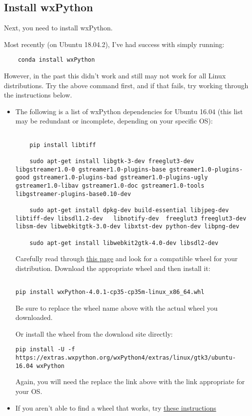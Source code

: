 \documentclass[11pt]{article}
\begin{document}
\subsection{Install wxPython}

Next, you need to install wxPython.

Most recently (on Ubuntu 18.04.2), I've had success with simply running:

\begin{verbatim}
    conda install wxPython
\end{verbatim}

However, in the past this didn't work and still may not work for all Linux distributions.  Try the above command first, and if that fails, try working through the instructions below.

\begin{itemize}
  \item The following is a list of wxPython dependencies for Ubuntu 16.04 (this list may be redundant or incomplete, depending on your specific OS):

  \begin{verbatim}

    pip install libtiff

    sudo apt-get install libgtk-3-dev freeglut3-dev libgstreamer1.0-0 gstreamer1.0-plugins-base gstreamer1.0-plugins-good gstreamer1.0-plugins-bad gstreamer1.0-plugins-ugly gstreamer1.0-libav gstreamer1.0-doc gstreamer1.0-tools libgstreamer-plugins-base0.10-dev

    sudo apt-get install dpkg-dev build-essential libjpeg-dev  libtiff-dev libsdl1.2-dev   libnotify-dev  freeglut3 freeglut3-dev libsm-dev libwebkitgtk-3.0-dev libxtst-dev python-dev libpng-dev

    sudo apt-get install libwebkit2gtk-4.0-dev libsdl2-dev
\end{verbatim}


Carefully read through \href{https://wxpython.org/pages/downloads/}{this page} and look for a compatible wheel for your distribution.  Download the appropriate wheel and then install it:
\begin{verbatim}

pip install wxPython-4.0.1-cp35-cp35m-linux_x86_64.whl

\end{verbatim}

Be sure to replace the wheel name above with the actual wheel you downloaded.

Or install the wheel from the download site directly:
\begin{verbatim}
pip install -U -f https://extras.wxpython.org/wxPython4/extras/linux/gtk3/ubuntu-16.04 wxPython

\end{verbatim}

Again, you will need the replace the link above with the link appropriate for your OS.

\item If you aren't able to find a wheel that works, try \href{https://wxpython.org/blog/2017-08-17-builds-for-linux-with-pip/}{these instructions}

\end{itemize}
\end{document}
